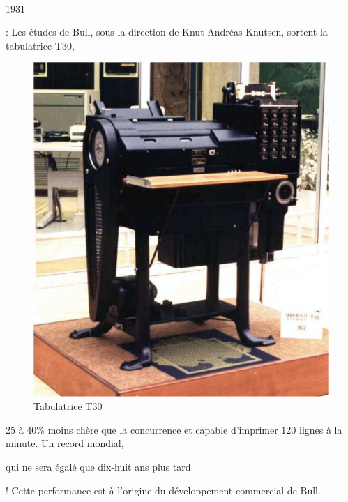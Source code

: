 \documentclass[11pt]{article}
\begin{document}
		\paragraph{}
		\begin{bf}1931\end{bf}: Les études de Bull, sous la direction de Knut Andréas Knutsen, sortent la tabulatrice T30,
		\begin{figure}
		\includegraphics[scale=0.25]{tabulatrice_t30.jpg}
		\caption{Tabulatrice T30}
		\end{figure}
		25 à 40\% moins chère que la concurrence et capable d’imprimer 120 lignes à la minute. Un record mondial, \begin{bf}qui 
		ne sera égalé que dix-huit ans plus tard\end{bf}! Cette performance est à l’origine du développement commercial de Bull.
		\newline{}
		\newline{}
		\newline{}
		\newline{}
		\newline{}
		\newline{}
		\newline{}
		\newline{}
\end{document}
